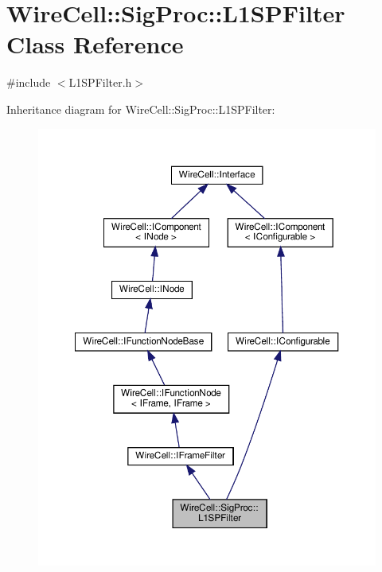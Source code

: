 \hypertarget{class_wire_cell_1_1_sig_proc_1_1_l1_s_p_filter}{}\section{Wire\+Cell\+:\+:Sig\+Proc\+:\+:L1\+S\+P\+Filter Class Reference}
\label{class_wire_cell_1_1_sig_proc_1_1_l1_s_p_filter}


{\ttfamily \#include $<$L1\+S\+P\+Filter.\+h$>$}



Inheritance diagram for Wire\+Cell\+:\+:Sig\+Proc\+:\+:L1\+S\+P\+Filter\+:
\nopagebreak
\begin{figure}[H]
\begin{center}
\leavevmode
\includegraphics[width=350pt]{class_wire_cell_1_1_sig_proc_1_1_l1_s_p_filter__inherit__graph}
\end{center}
\end{figure}



